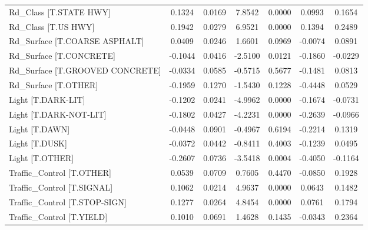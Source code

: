 \begin{longtable}{p{4cm}cccccc}
Rd\_Class [T.STATE HWY]          &  0.1324 &    0.0169 &   7.8542 &       0.0000 &  0.0993 &  0.1654 \\
Rd\_Class [T.US HWY]             &  0.1942 &    0.0279 &   6.9521 &       0.0000 &  0.1394 &  0.2489 \\
Rd\_Surface [T.COARSE ASPHALT]   &  0.0409 &    0.0246 &   1.6601 &       0.0969 & -0.0074 &  0.0891 \\
Rd\_Surface [T.CONCRETE]         & -0.1044 &    0.0416 &  -2.5100 &       0.0121 & -0.1860 & -0.0229 \\
Rd\_Surface [T.GROOVED CONCRETE] & -0.0334 &    0.0585 &  -0.5715 &       0.5677 & -0.1481 &  0.0813 \\
Rd\_Surface [T.OTHER]            & -0.1959 &    0.1270 &  -1.5430 &       0.1228 & -0.4448 &  0.0529 \\
Light [T.DARK-LIT]              & -0.1202 &    0.0241 &  -4.9962 &       0.0000 & -0.1674 & -0.0731 \\
Light [T.DARK-NOT-LIT]          & -0.1802 &    0.0427 &  -4.2231 &       0.0000 & -0.2639 & -0.0966 \\
Light [T.DAWN]                  & -0.0448 &    0.0901 &  -0.4967 &       0.6194 & -0.2214 &  0.1319 \\
Light [T.DUSK]                  & -0.0372 &    0.0442 &  -0.8411 &       0.4003 & -0.1239 &  0.0495 \\
Light [T.OTHER]                 & -0.2607 &    0.0736 &  -3.5418 &       0.0004 & -0.4050 & -0.1164 \\
Traffic\_Control [T.OTHER]       &  0.0539 &    0.0709 &   0.7605 &       0.4470 & -0.0850 &  0.1928 \\
Traffic\_Control [T.SIGNAL]      &  0.1062 &    0.0214 &   4.9637 &       0.0000 &  0.0643 &  0.1482 \\
Traffic\_Control [T.STOP-SIGN]   &  0.1277 &    0.0264 &   4.8454 &       0.0000 &  0.0761 &  0.1794 \\
Traffic\_Control [T.YIELD]       &  0.1010 &    0.0691 &   1.4628 &       0.1435 & -0.0343 &  0.2364 \\
\end{longtable}
